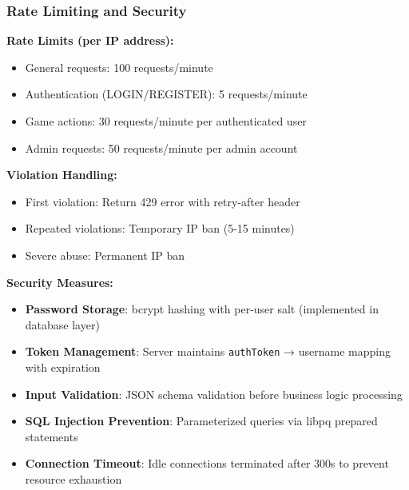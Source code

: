 \subsubsection{Rate Limiting and Security}

\textbf{Rate Limits (per IP address):}
\begin{itemize}
    \item General requests: 100 requests/minute
    \item Authentication (LOGIN/REGISTER): 5 requests/minute
    \item Game actions: 30 requests/minute per authenticated user
    \item Admin requests: 50 requests/minute per admin account
\end{itemize}

\textbf{Violation Handling:}
\begin{itemize}
    \item First violation: Return 429 error with retry-after header
    \item Repeated violations: Temporary IP ban (5-15 minutes)
    \item Severe abuse: Permanent IP ban
\end{itemize}

\textbf{Security Measures:}
\begin{itemize}
    \item \textbf{Password Storage}: bcrypt hashing with per-user salt (implemented in database layer)
    \item \textbf{Token Management}: Server maintains \texttt{authToken} → username mapping with expiration
    \item \textbf{Input Validation}: JSON schema validation before business logic processing
    \item \textbf{SQL Injection Prevention}: Parameterized queries via libpq prepared statements
    \item \textbf{Connection Timeout}: Idle connections terminated after 300s to prevent resource exhaustion
\end{itemize}
